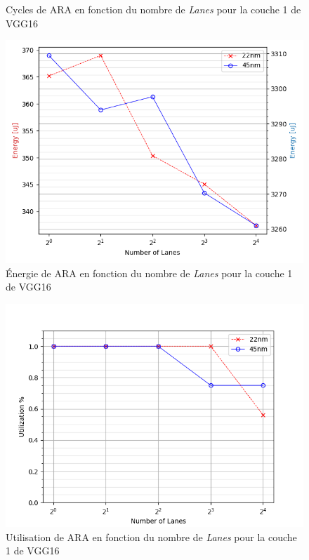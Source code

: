 \documentclass[11pt,letterpaper]{article}
\begin{document}
\begin{multicols}{2}
\begin{figure}[H]
        \caption{Cycles de ARA en fonction du nombre de \textit{Lanes} pour la couche 1 de VGG16}
        \label{fig:cycles}
    \end{figure}
    \begin{figure}[H]
        \centering
        \includegraphics[width=\linewidth]{energy.png}
        \caption{Énergie de ARA en fonction du nombre de \textit{Lanes} pour la couche 1 de VGG16}
        \label{fig:energy}
    \end{figure}
    \begin{figure}[H]
        \centering
        \includegraphics[width=\linewidth]{utilization.png}
        \caption{Utilisation de ARA en fonction du nombre de \textit{Lanes} pour la couche 1 de VGG16}

\end{figure}
\end{multicols}
\end{document}
